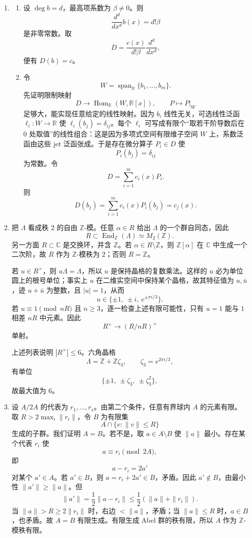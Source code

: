 \documentclass[UTF8,12pt]{ctexart}
\begin{document}
\begin{enumerate}[label=\textbf{\arabic*.},leftmargin=2.2em]
\item
\begin{enumerate}[label=\textbf{(\arabic*)},leftmargin=2.4em]
\item 设 \(\deg b=d\)，最高项系数为 \(\beta\ne0\)。则
\[
\frac{d^d}{dx^d}b(x)=d!\beta
\]
是非零常数。取
\[
D=\frac{c(x)}{d!\beta}\frac{d^d}{dx^d},
\]
便有 \(D(b)=c\)。
\item 令
\[
W=\operatorname{span}_{\mathbb R}\{b_1,\ldots,b_m\}.
\]
先证明限制映射
\[
D\longrightarrow \operatorname{Hom}_{\mathbb R}(W,\mathbb R[x]),\qquad P\mapsto P|_W
\]
足够大，能实现任意给定的线性映射。因为 \(b_i\) 线性无关，可选线性泛函 \(\ell_i:W\to\mathbb R\) 使 \(\ell_i(b_j)=\delta_{ij}\)。每个 \(\ell_i\) 可写成有限个“取若干阶导数后在 \(0\) 处取值”的线性组合：这是因为多项式空间有限维子空间 \(W\) 上，系数泛函由这些 jet 泛函张成。于是存在微分算子 \(P_i\in D\) 使
\[
P_i(b_j)=\delta_{ij}
\]
为常数。令
\[
D=\sum_{i=1}^m c_i(x)P_i.
\]
则
\[
D(b_j)=\sum_{i=1}^m c_i(x)P_i(b_j)=c_j(x).
\]
\end{enumerate}

\item 把 \(\Lambda\) 看成秩 \(2\) 的自由 \(\mathbb Z\)-模。任意 \(\alpha\in R\) 给出 \(\Lambda\) 的一个群自同态，因此
\[
R\subset \operatorname{End}_{\mathbb Z}(\Lambda)\simeq M_2(\mathbb Z).
\]
另一方面 \(R\subset\mathbb C\) 是交换环，并含 \(\mathbb Z\)。若 \(\alpha\in R\setminus\mathbb Z\)，则 \(\mathbb Z[\alpha]\) 在 \(\mathbb C\) 中生成一个二次阶，故 \(R\) 作为 \(\mathbb Z\)-模秩为 \(2\)；否则 \(R=\mathbb Z\)。

若 \(u\in R^\times\)，则 \(u\Lambda=\Lambda\)，所以 \(u\) 是保持晶格的复数乘法。这样的 \(u\) 必为单位圆上的根号单位；事实上 \(u\) 在二维实空间中保持某个晶格，故其特征值为 \(u,\bar u\)，迹 \(u+\bar u\) 为整数，且 \(|u|=1\)，从而
\[
u\in\{\pm1,\ \pm i,\ e^{\pm\pi i/3}\}.
\]
若 \(u\equiv1\pmod{nR}\) 且 \(n\ge3\)，逐一检查上述有限可能性，只有 \(u=1\) 能与 \(1\) 相差 \(nR\) 中元素。因此
\[
R^\times\to(R/nR)^\times
\]
单射。

上述列表说明 \(|R^\times|\le6\)。六角晶格
\[
\Lambda=\mathbb Z+\mathbb Z\zeta_3,\qquad \zeta_3=e^{2\pi i/3},
\]
有单位
\[
\{\pm1,\ \pm\zeta_3,\ \pm\zeta_3^2\},
\]
故最大值为 \(6\)。

\item 设 \(A/2A\) 的代表为 \(r_1,\ldots,r_s\)。由第二个条件，任意有界球内 \(A\) 的元素有限。取 \(R>2\max_i\|r_i\|\)，令 \(B\) 为有限集
\[
A\cap\{v:\|v\|\le R\}
\]
生成的子群。我们证明 \(A=B\)。若不是，取 \(a\in A\setminus B\) 使 \(\|a\|\) 最小。存在某个代表 \(r_i\) 使
\[
a\equiv r_i\pmod{2A},
\]
即
\[
a-r_i=2a'
\]
对某个 \(a'\in A\)。若 \(a'\in B\)，则 \(a=r_i+2a'\in B\)，矛盾。因此 \(a'\notin B\)，由最小性 \(\|a'\|\ge\|a\|\)。但
\[
\|a'\|=\frac12\|a-r_i\|\le\frac12(\|a\|+\|r_i\|).
\]
当 \(\|a\|>R\ge2\|r_i\|\) 时，右边 \(<\|a\|\)，矛盾；当 \(\|a\|\le R\) 时，\(a\in B\)，也矛盾。故 \(A=B\) 有限生成。有限生成 Abel 群的秩有限，所以 \(A\) 作为 \(\mathbb Z\)-模秩有限。
\end{enumerate}
\end{document}

